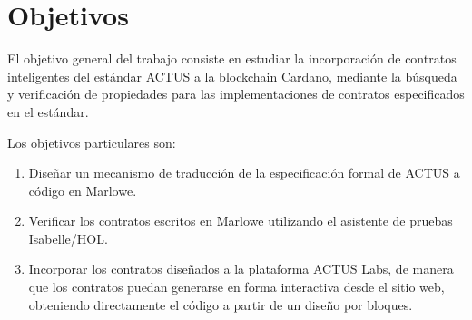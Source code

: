 \documentclass[12pt]{book}
\begin{document}

\bigskip


\section{Objetivos}

El objetivo general del trabajo consiste en estudiar la incorporación de contratos inteligentes del estándar ACTUS a la blockchain Cardano, mediante la búsqueda y verificación de propiedades para las implementaciones de contratos especificados en el estándar.

Los objetivos particulares son:

\begin{enumerate}
    \item Diseñar un mecanismo de traducción de la especificación formal de ACTUS a código en Marlowe.
    \item Verificar los contratos escritos en Marlowe utilizando el asistente de pruebas Isabelle/HOL.\@
    \item Incorporar los contratos diseñados a la plataforma ACTUS Labs, de manera que los contratos puedan generarse en forma interactiva desde el sitio web, obteniendo directamente el código a partir de un diseño por bloques.%
\end{enumerate}

\bigskip






\end{document}
